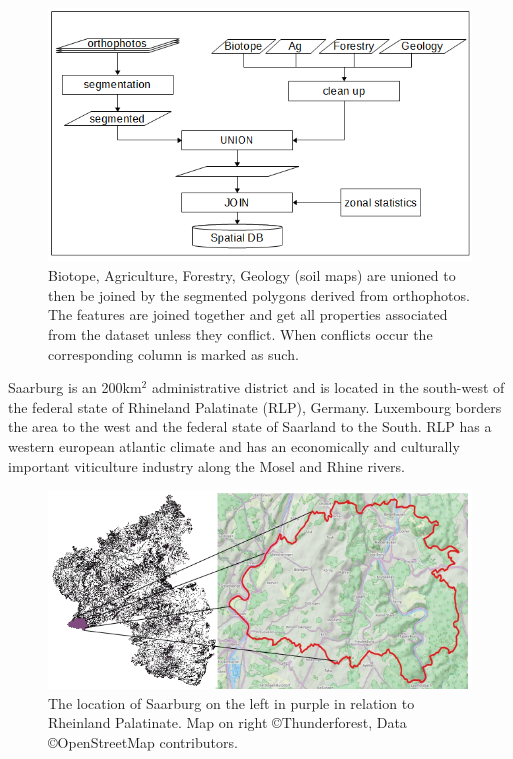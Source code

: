 \documentclass[authoryear, review,12pt,number]{elsarticle}
\begin{document}
\begin{figure} \includegraphics[width=1\textwidth]{diagrams/pre_processing.png}
    \caption{Biotope, Agriculture, Forestry, Geology (soil maps) are unioned to
    then be joined by the segmented polygons derived from orthophotos. The
    features are joined together and get all properties associated from the
    dataset unless they conflict. When conflicts occur the corresponding column
    is marked as such.}
\label{fig_pre-processing}
\end{figure}
Saarburg is an 200km$^{2}$ administrative district and is located in the
south-west of the federal state of Rhineland Palatinate (RLP), Germany.
Luxembourg borders the area to the west and the federal state of Saarland to
the South. RLP has a western european atlantic climate and has an economically
and culturally important viticulture industry along the Mosel and Rhine rivers.
\begin{figure}
\label{fig_study_area}
    \includegraphics[width=\textwidth]{diagrams/study_area_closeup.png}
    \caption{The location of Saarburg on the left in purple in relation to
    Rheinland Palatinate. Map on right \copyright Thunderforest, Data
\copyright OpenStreetMap contributors.}
\end{figure}
\end{document}

